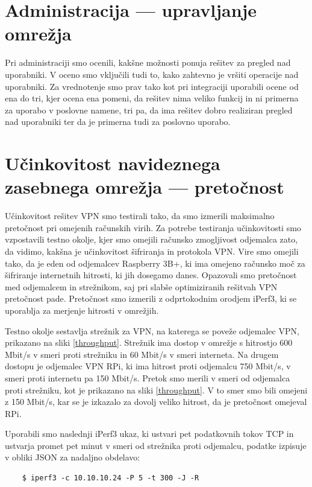 \documentclass[a4paper, 12pt]{book}
\begin{document}
\section{Administracija --- upravljanje omrežja}
\label{test_administracija}
Pri administraciji smo ocenili, kakšne možnosti ponuja rešitev za pregled nad uporabniki. V oceno smo vključili tudi to, kako zahtevno je vršiti operacije nad uporabniki. Za vrednotenje smo prav tako kot pri integraciji uporabili ocene od ena do tri, kjer ocena ena pomeni, da rešitev nima veliko funkcij in ni primerna za uporabo v poslovne namene, tri pa, da ima rešitev dobro realiziran pregled nad uporabniki ter da je primerna tudi za poslovno uporabo.



\section{Učinkovitost navideznega zasebnega omrežja --- pretočnost}
\label{test_ucinkovitost}
Učinkovitost rešitev VPN smo testirali tako, da smo izmerili maksimalno pretočnost pri omejenih računskih virih. Za potrebe testiranja učinkovitosti smo vzpostavili testno okolje, kjer smo omejili računsko zmogljivost odjemalca zato, da vidimo, kakšna je učinkovitost šifriranja in protokola VPN. Vire smo omejili tako, da je eden od odjemalcev Raspberry 3B+, ki ima omejeno računsko moč za šifriranje internetnih hitrosti, ki jih dosegamo danes. Opazovali smo pretočnost med odjemalcem in strežnikom, saj pri slabše optimiziranih rešitvah VPN pretočnost pade. Pretočnost smo izmerili z odprtokodnim orodjem iPerf3, ki se uporablja za merjenje hitrosti v omrežjih.

Testno okolje sestavlja strežnik za VPN, na katerega se poveže odjemalec VPN, prikazano na sliki \ref{throughput}. Strežnik ima dostop v omrežje s hitrostjo 600 Mbit/s v smeri proti strežniku in 60 Mbit/s v smeri interneta. Na drugem dostopu je odjemalec VPN RPi, ki ima hitrost proti odjemalcu 750 Mbit/s, v smeri proti internetu pa 150 Mbit/s. Pretok smo merili v smeri od odjemalca proti strežniku, kot je prikazano na sliki \ref{throughput}. V to smer smo bili omejeni z 150 Mbit/s, kar se je izkazalo za dovolj veliko hitrost, da je pretočnost omejeval RPi.

Uporabili smo naslednji iPerf3 ukaz, ki ustvari pet podatkovnih tokov TCP in ustvarja promet pet minut v smeri od strežnika proti odjemalcu, podatke izpisuje v obliki JSON za nadaljno obdelavo:

\begin{verbatim}
    $ iperf3 -c 10.10.10.24 -P 5 -t 300 -J -R
  
\end{verbatim}
\end{document}
